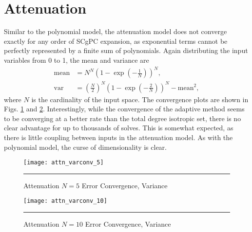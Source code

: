 \section{Attenuation}
Similar to the polynomial model, the attenuation model does not converge exactly for any order of SCgPC
expansion, as exponential terms cannot be perfectly represented by a finite sum of polynomials.
Again distributing the input variables from 0 to 1, the mean and variance are
\begin{align}
  \text{mean}&=N^N\left(1-\exp(-\frac{1}{N})\right)^N,\\
  \text{var}&=\left(\frac{N}{2}\right)^N \left(1-\exp(-\frac{2}{N})\right)^N - \text{mean}^2,
\end{align}
where $N$ is the cardinality of the input space.  The convergence plots are shown in Figs.
\ref{fig:att5_varconv} and \ref{fig:att10_varconv}.
Interestingly, while the convergence of the adaptive method seems to be converging at a better rate than the
total degree isotropic set, there is no clear advantage for up to thousands of solves.  This is somewhat
expected, as there is little coupling between inputs in the attenuation model.  As with the polynomial model,
the curse of dimensionality is clear.

\begin{figure}[H]
  \centering
    \texttt{[image: attn\_varconv\_5]}
    \rule{35em}{0.5pt}
  \caption{Attenuation $N=5$ Error Convergence, Variance}
  \label{fig:att5_varconv}
\end{figure}

\begin{figure}[H]
  \centering
    \texttt{[image: attn\_varconv\_10]}
    \rule{35em}{0.5pt}
  \caption{Attenuation $N=10$ Error Convergence, Variance}
  \label{fig:att10_varconv}
\end{figure}



